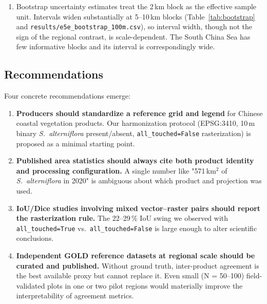 \documentclass[11pt]{article}
\begin{document}
\begin{enumerate}[nosep]
  pixels fall outside any marine polygon and are assigned by nearest-group
  boundary. The R4 attribution audit shows that the regional rankings and the
  Bohai/Yellow--South China contrast are insensitive to the attribution
  policy (direct-only, capped, or uncapped; Table~\ref{tab:region_policy}),
  with assigned pixels concentrated in the East China group (median distance
  6.83\,km, 99th percentile 50.4\,km). Per-polygon results are released so
  that alternative groupings can be recomputed.
\item Bootstrap uncertainty estimates treat the 2\,km block as the effective
  sample unit. Intervals widen substantially at 5--10\,km blocks
  (Table~\ref{tab:bootstrap} and \texttt{results/e5e\_bootstrap\_100m.csv}),
  so interval width, though not the sign of the regional contrast, is
  scale-dependent. The South China Sea has few informative blocks and its
  interval is correspondingly wide.
\end{enumerate}

\subsection{Recommendations}

Four concrete recommendations emerge:
\begin{enumerate}[nosep]
\item \textbf{Producers should standardize a reference grid and legend} for
  Chinese coastal vegetation products. Our harmonization protocol (EPSG:3410,
  10\,m binary \textit{S.~alterniflora} present/absent, \texttt{all\_touched=False}
  rasterization) is proposed as a minimal starting point.
\item \textbf{Published area statistics should always cite both product identity
  and processing configuration.} A single number like "571\,km$^2$ of
  \textit{S.~alterniflora} in 2020" is ambiguous about which product and
  projection was used.
\item \textbf{IoU/Dice studies involving mixed vector--raster pairs should report
  the rasterization rule.} The 22--29\,\% IoU swing we observed with
  \texttt{all\_touched=True} vs.\ \texttt{all\_touched=False} is large enough
  to alter scientific conclusions.
\item \textbf{Independent GOLD reference datasets at regional scale should be
  curated and published.} Without ground truth, inter-product agreement is
  the best available proxy but cannot replace it. Even small (N = 50--100)
  field-validated plots in one or two pilot regions would materially improve
  the interpretability of agreement metrics.
\end{enumerate}
\end{document}
